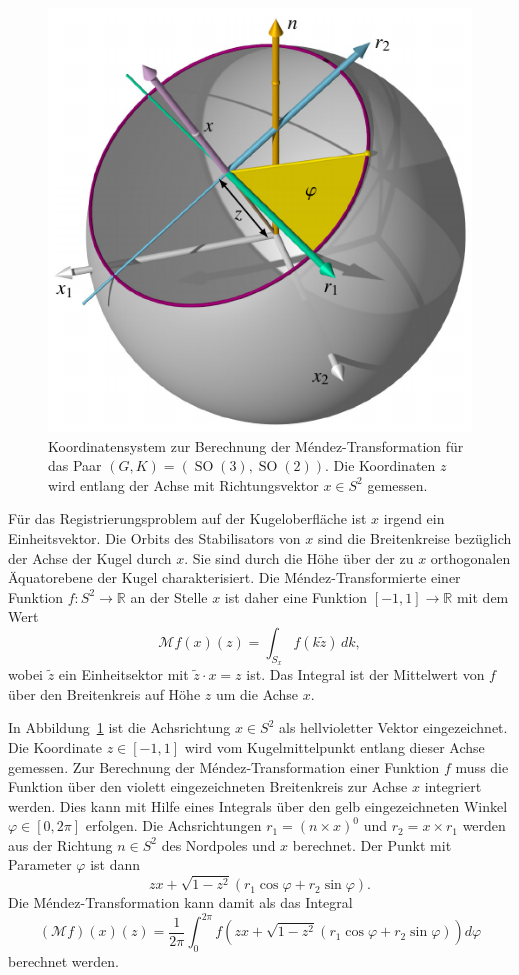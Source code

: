 \begin{beispiel}
\begin{figure}
\centering
\includegraphics{chapters/070-nichtkomm/images/coordinates.pdf}
\caption{Koordinatensystem zur Berechnung der Méndez-Transformation
für das Paar $(G,K)=(\operatorname{SO}(3),\operatorname{SO}(2))$.
Die Koordinaten $z$ wird entlang der Achse mit Richtungsvektor $x\in S^2$
gemessen.
\label{buch:nichtkomm:mendez:fig:coordinates}}
\end{figure}
Für das Registrierungsproblem auf der Kugeloberfläche ist $x$ irgend ein
Einheitsvektor.
Die Orbits des Stabilisators von $x$ sind die Breitenkreise bezüglich
der Achse der Kugel durch $x$.
Sie sind durch die Höhe über der zu $x$ orthogonalen Äquatorebene der
Kugel charakterisiert.
Die Méndez-Transformierte einer Funktion $f\colon S^2\to \mathbb{R}$
an der Stelle $x$ ist daher eine Funktion $[-1,1]\to\mathbb{R}$ mit
dem Wert
\[
\mathcal{M}f (x)(z)
=
\int_{S_x} f(k\tilde{z})\,dk,
\]
wobei $\tilde{z}$ ein Einheitsektor mit $\tilde{z}\cdot x=z$ ist.
Das Integral ist der Mittelwert von $f$ über den Breitenkreis
auf Höhe $z$ um die Achse $x$.

In Abbildung~\ref{buch:nichtkomm:mendez:fig:coordinates} ist die
Achsrichtung $x\in S^2$ als hellvioletter Vektor eingezeichnet.
Die Koordinate $z\in[-1,1]$ wird vom Kugelmittelpunkt entlang dieser
Achse gemessen.
Zur Berechnung der Méndez-Transformation einer Funktion $f$ muss die
Funktion über den violett eingezeichneten Breitenkreis zur Achse $x$
integriert werden.
Dies kann mit Hilfe eines Integrals über den gelb eingezeichneten
Winkel $\varphi\in[0,2\pi]$ erfolgen.
Die Achsrichtungen $r_1=(n\times x)^0$ und $r_2=x\times r_1$ werden
aus der Richtung $n\in S^2$ des Nordpoles und $x$ berechnet.
Der Punkt mit Parameter $\varphi$ ist dann
\[
zx
+
\!\sqrt{1-z^2}(r_1 \cos\varphi + r_2 \sin\varphi).
\]
Die Méndez-Transformation kann damit als das Integral
\[
(\mathcal{M}f)(x)(z)
=
\frac{1}{2\pi}
\int_0^{2\pi}
f\left(
zx
+
\!\sqrt{1-z^2}(r_1 \cos\varphi + r_2 \sin\varphi)
\right)
d\varphi
\]
berechnet werden.
\end{beispiel}

